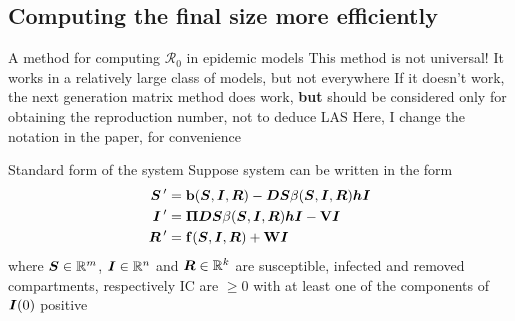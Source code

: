 \documentclass[aspectratio=169]{beamer}\usepackage[]{graphicx}\usepackage[]{xcolor}
\begin{document}

\subsection{Computing the final size more efficiently}

\nocite{ArinoBrauerDriesscheWatmoughWu2007}

\begin{frame}{A method for computing $\mathcal{R}_0$ in epidemic models}
\bbullet This method is not universal! It works in a relatively large class of models, but not everywhere
\vfill
\bbullet If it doesn't work, the next generation matrix method does work, \textbf{but} should be considered only for obtaining the reproduction number, not to deduce LAS
\vfill
\bbullet Here, I change the notation in the paper, for convenience
\end{frame}

\begin{frame}{Standard form of the system}
Suppose system can be written in the form
\begin{subequations}\label{sys:SIR_general}
\begin{align}
\bm{S}\,' &= \mathbf{b}(\bm{S},\bm{I},\bm{R})-\bm{D}\bm{S}\beta(\bm{S},\bm{I},\bm{R})\bm{h}\bm{I} \label{sys:SIR_general_dS} \\
\bm{I}\,' &= \bm{\Pi}\bm{D}\bm{S}\beta(\bm{S},\bm{I},\bm{R})\bm{h}\bm{I}-\mathbf{V}\bm{I} \label{sys:SIR_general_dI} \\
\bm{R}\,' &= \mathbf{f}(\bm{S},\bm{I},\bm{R})+\mathbf{W}\bm{I} \label{sys:SIR_general_dR}
\end{align}
\end{subequations}
\vfill
where $\bm{S}\in\mathbb{R}^m$, $\bm{I}\in\mathbb{R}^n$ and $\bm{R}\in\mathbb{R}^k$ are susceptible, infected and removed compartments, respectively
\vfill
IC are $\geq 0$ with at least one of the components of $\bm{I}(0)$ positive
\end{frame}  
\end{document}
